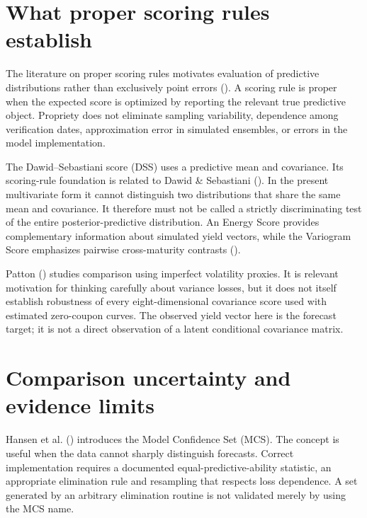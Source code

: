 \documentclass[
  12pt,
  letterpaper,
  DIV=11,
  numbers=noendperiod]{scrreprt}
\begin{document}
\section{What proper scoring rules
establish}\label{what-proper-scoring-rules-establish}

The literature on proper scoring rules motivates evaluation of
predictive distributions rather than exclusively point errors
(). A
scoring rule is proper when the expected score is optimized by reporting
the relevant true predictive object. Propriety does not eliminate
sampling variability, dependence among verification dates, approximation
error in simulated ensembles, or errors in the model implementation.

The Dawid--Sebastiani score (DSS) uses a predictive mean and covariance.
Its scoring-rule foundation is related to Dawid \& Sebastiani
(). In the present multivariate
form it cannot distinguish two distributions that share the same mean
and covariance. It therefore must not be called a strictly
discriminating test of the entire posterior-predictive distribution. An
Energy Score provides complementary information about simulated yield
vectors, while the Variogram Score emphasizes pairwise cross-maturity
contrasts ().

Patton () studies comparison
using imperfect volatility proxies. It is relevant motivation for
thinking carefully about variance losses, but it does not itself
establish robustness of every eight-dimensional covariance score used
with estimated zero-coupon curves. The observed yield vector here is the
forecast target; it is not a direct observation of a latent conditional
covariance matrix.

\section{Comparison uncertainty and evidence
limits}\label{comparison-uncertainty-and-evidence-limits}

Hansen et al. () introduces the
Model Confidence Set (MCS). The concept is useful when the data cannot
sharply distinguish forecasts. Correct implementation requires a
documented equal-predictive-ability statistic, an appropriate
elimination rule and resampling that respects loss dependence. A set
generated by an arbitrary elimination routine is not validated merely by
using the MCS name.
\end{document}
